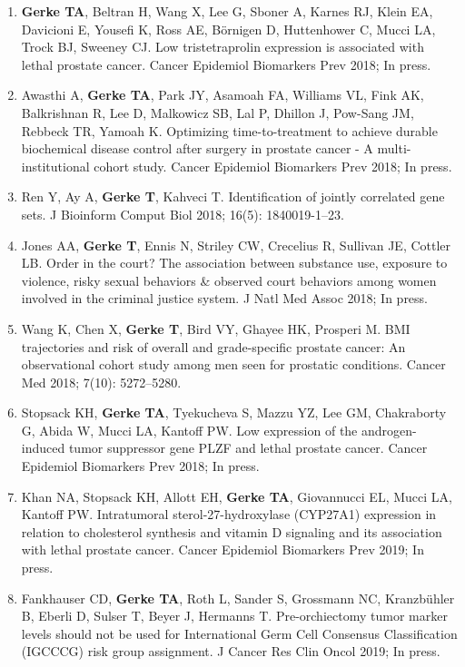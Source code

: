\documentclass[11pt, a4paper]{article} %
\begin{document}
\begin{enumerate}[leftmargin=*]
\item{} {\bf Gerke TA}, Beltran H, Wang X, Lee G, Sboner A, Karnes RJ, Klein EA, Davicioni E, Yousefi K, Ross AE, B\"{o}rnigen D, Huttenhower C, Mucci LA, Trock BJ, Sweeney CJ. Low tristetraprolin expression is associated with lethal prostate cancer. Cancer Epidemiol Biomarkers Prev 2018; In press.

\item{} Awasthi A, {\bf Gerke TA}, Park JY, Asamoah FA, Williams VL, Fink AK, Balkrishnan R, Lee D, Malkowicz SB, Lal P, Dhillon J, Pow-Sang JM, Rebbeck TR, Yamoah K. Optimizing time-to-treatment to achieve durable biochemical disease control after surgery in prostate cancer - A multi-institutional cohort study. Cancer Epidemiol Biomarkers Prev 2018; In press.

\item{} Ren Y, Ay A, {\bf Gerke T}, Kahveci T. Identification of jointly correlated gene sets. J Bioinform Comput Biol 2018; 16(5): 1840019-1--23.

\item{} Jones AA, {\bf Gerke T}, Ennis N, Striley CW, Crecelius R, Sullivan JE, Cottler LB. Order in the court? The association between substance use, exposure to violence, risky sexual behaviors \& observed court behaviors among women involved in the criminal justice system. J Natl Med Assoc 2018; In press.

\item{} Wang K, Chen X, {\bf Gerke T}, Bird VY, Ghayee HK, Prosperi M. BMI trajectories and risk of overall and grade-specific prostate cancer: An observational cohort study among men seen for prostatic conditions. Cancer Med 2018; 7(10): 5272--5280.

\item{} Stopsack KH, {\bf Gerke TA}, Tyekucheva S, Mazzu YZ, Lee GM, Chakraborty G, Abida W, Mucci LA, Kantoff PW. Low expression of the androgen-induced tumor suppressor gene PLZF and lethal prostate cancer. Cancer Epidemiol Biomarkers Prev 2018; In press.

\item{} Khan NA, Stopsack KH, Allott EH, {\bf Gerke TA}, Giovannucci EL, Mucci LA, Kantoff PW. Intratumoral sterol-27-hydroxylase (CYP27A1) expression in relation to cholesterol synthesis and vitamin D signaling and its association with lethal prostate cancer. Cancer Epidemiol Biomarkers Prev 2019; In press.

\item{} Fankhauser CD, {\bf Gerke TA}, Roth L, Sander S, Grossmann NC, Kranzb{\"u}hler B, Eberli D, Sulser T, Beyer J, Hermanns T. Pre-orchiectomy tumor marker levels should not be used for International Germ Cell Consensus Classification (IGCCCG) risk group assignment. J Cancer Res Clin Oncol 2019; In press.


\end{enumerate}
\end{document}
